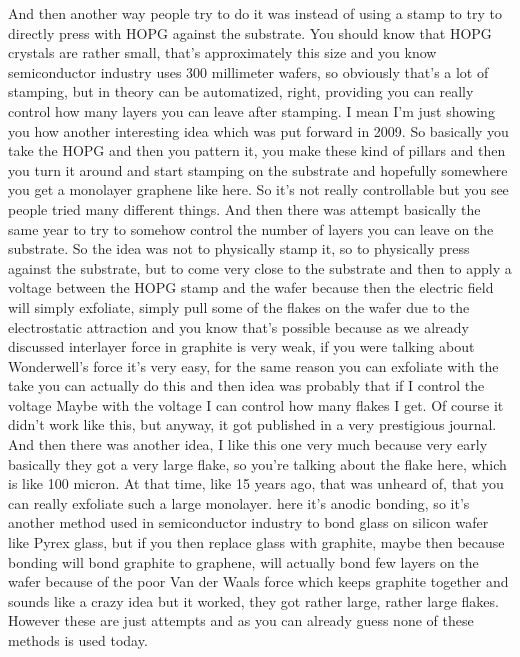 And then another way people try to do it was instead of using a stamp to try to directly press with HOPG against the substrate. You should know that HOPG crystals are rather small, that's approximately this size and you know semiconductor industry uses 300 millimeter wafers, so obviously that's a lot of stamping, but in theory can be automatized, right, providing you can really control how many layers you can leave after stamping. I mean I'm just showing you how another interesting idea which was put forward in 2009. So basically you take the HOPG and then you pattern it, you make these kind of pillars and then you turn it around and start stamping on the substrate and hopefully somewhere you get a monolayer graphene like here. So it's not really controllable but you see people tried many different things.
And then there was attempt basically the same year to try to somehow control the number of layers you can leave on the substrate. So the idea was not to physically stamp it, so to physically press against the substrate, but to come very close to the substrate and then to apply a voltage between the HOPG stamp and the wafer because then the electric field will simply exfoliate, simply pull some of the flakes on the wafer due to the electrostatic attraction and you know that's possible because as we already discussed interlayer force in graphite is very weak, if you were talking about Wonderwell's force it's very easy, for the same reason you can exfoliate with the take you can actually do this and then idea was probably that if I control the voltage Maybe with the voltage I can control how many flakes I get. Of course it didn't work like this, but anyway, it got published in a very prestigious journal.
And then there was another idea, I like this one very much because very early basically they got a very large flake, so you're talking about the flake here, which is like 100 micron. At that time, like 15 years ago, that was unheard of, that you can really exfoliate such a large monolayer. here it's anodic bonding, so it's another method used in semiconductor industry to bond glass on silicon wafer like Pyrex glass, but if you then replace glass with graphite, maybe then because bonding will bond graphite to graphene, will actually bond few layers on the wafer because of the poor Van der Waals force which keeps graphite together and sounds like a crazy idea but it worked, they got rather large, rather large flakes. However these are just attempts and as you can already guess none of these methods is used today.
